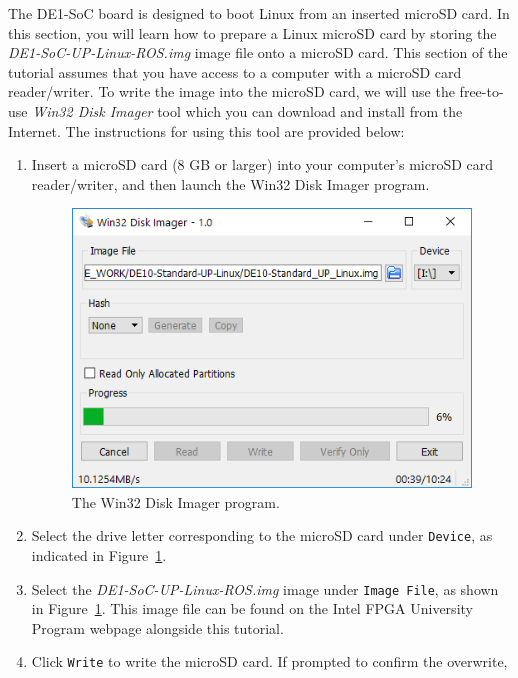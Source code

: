\documentclass[11pt, twoside, pdftex]{article}
\begin{document}
The DE1-SoC board is designed to boot Linux from an inserted microSD card. In this section, 
you will learn how to prepare a Linux microSD card by storing the
\textit{DE1-SoC-UP-Linux-ROS.img}
image file onto a microSD card. This section of the tutorial assumes that you have access to a 
computer with a microSD card reader/writer. To write the image into the microSD card, we will 
use the free-to-use \textit{Win32 Disk Imager} tool which you can download and install from 
the Internet. The instructions for using this tool are provided below:

\begin{enumerate}

\item Insert a microSD card (8 GB or larger) into your computer's microSD card reader/writer,
and then launch the Win32 Disk Imager program.
\begin{figure} [h]
\begin{center}
\includegraphics[scale = 0.7]{figures/Win32DiskImager1.png}
\end{center}
\caption{The Win32 Disk Imager program.}
\label{fig:win32_disk_imager}
\end{figure}
\item Select the drive letter corresponding to the microSD card under \texttt{Device}, as indicated 
in Figure~\ref{fig:win32_disk_imager}.
\item Select the \textit{DE1-SoC-UP-Linux-ROS.img} image under \texttt{Image File}, as shown in 
Figure~\ref{fig:win32_disk_imager}. This image file can be found on the Intel FPGA University 
Program webpage alongside this tutorial.
\item Click \texttt{Write} to write the microSD card. If prompted to confirm the overwrite, 

\end{enumerate}
\end{document}
